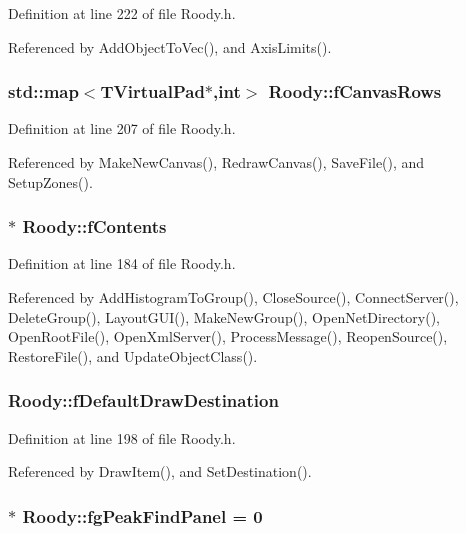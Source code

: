 Definition at line 222 of file Roody.h.

Referenced by AddObjectToVec(), and AxisLimits().
\subsubsection[{fCanvasRows}]{\setlength{\rightskip}{0pt plus 5cm}std::map$<$TVirtualPad$\ast$,int$>$ {\bf Roody::fCanvasRows}\hspace{0.3cm}{\ttfamily  [private]}}\label{classRoody_a5a2e7e58f4e6c7365092297a15904c84}


Definition at line 207 of file Roody.h.

Referenced by MakeNewCanvas(), RedrawCanvas(), SaveFile(), and SetupZones().
\subsubsection[{fContents}]{$\ast$ {\bf Roody::fContents}\hspace{0.3cm}{\ttfamily  [protected]}}\label{classRoody_a58d82692b76daddd62008acd8613a165}


Definition at line 184 of file Roody.h.

Referenced by AddHistogramToGroup(), CloseSource(), ConnectServer(), DeleteGroup(), LayoutGUI(), MakeNewGroup(), OpenNetDirectory(), OpenRootFile(), OpenXmlServer(), ProcessMessage(), ReopenSource(), RestoreFile(), and UpdateObjectClass().
\subsubsection[{fDefaultDrawDestination}]{ {\bf Roody::fDefaultDrawDestination}\hspace{0.3cm}{\ttfamily  [private]}}\label{classRoody_a85f7442dcfb56450d8aa7eb6f21690e1}


Definition at line 198 of file Roody.h.

Referenced by DrawItem(), and SetDestination().
\subsubsection[{fgPeakFindPanel}]{ $\ast$ {\bf Roody::fgPeakFindPanel} = 0\hspace{0.3cm}{\ttfamily  [static, private]}}\label{classRoody_a77bfde3c103b507e1692f9587b93ff47}



